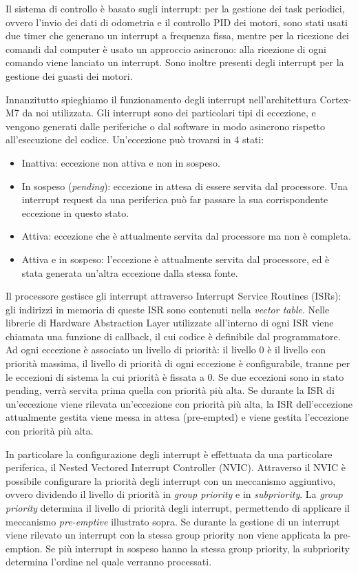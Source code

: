 Il sistema di controllo è basato sugli interrupt: per la gestione dei task periodici, ovvero l'invio dei dati di odometria e il controllo PID dei motori, sono stati usati due timer che generano un interrupt a frequenza fissa, mentre per la ricezione dei comandi dal computer è usato un approccio asincrono: alla ricezione di ogni comando viene lanciato un interrupt. Sono inoltre presenti degli interrupt per la gestione dei guasti dei motori.

Innanzitutto spieghiamo il funzionamento degli interrupt nell'architettura Cortex-M7 da noi utilizzata.
Gli interrupt sono dei particolari tipi di eccezione, e vengono generati dalle periferiche o dal software in modo asincrono rispetto all'esecuzione del codice.
Un'eccezione può trovarsi in 4 stati:
\begin{itemize}
    \item Inattiva: eccezione non attiva e non in sospeso.
    \item In sospeso (\textit{pending}): eccezione in attesa di essere servita dal processore. Una interrupt request da una periferica può far passare la sua corrispondente eccezione in questo stato. 
    \item Attiva: eccezione che è attualmente servita dal processore ma non è completa.
    \item Attiva e in sospeso: l'eccezione è attualmente servita dal processore, ed è stata generata un'altra eccezione dalla stessa fonte. 
\end{itemize}
Il processore gestisce gli interrupt attraverso Interrupt Service Routines (ISRs): gli indirizzi in memoria di queste ISR sono contenuti nella \textit{vector table}. Nelle librerie di Hardware Abstraction Layer utilizzate all'interno di ogni ISR viene chiamata una funzione di callback, il cui codice è definibile dal programmatore.
Ad ogni eccezione è associato un livello di priorità: il livello 0 è il livello con priorità massima, il livello di priorità di ogni eccezione è configurabile, tranne per le eccezioni di sistema la cui priorità è fissata a 0.
Se due eccezioni sono in stato pending, verrà servita prima quella con priorità più alta.
Se durante la ISR di un'eccezione viene rilevata un'eccezione con priorità più alta, la ISR dell'eccezione attualmente gestita viene messa in attesa (pre-empted) e viene gestita l'eccezione con priorità più alta.

In particolare la configurazione degli interrupt è effettuata da una particolare periferica, il Nested Vectored Interrupt Controller (NVIC). Attraverso il NVIC è possibile configurare la priorità degli interrupt con un meccanismo aggiuntivo, ovvero dividendo il livello di priorità in \textit{group priority} e in \textit{subpriority}. 
La \textit{group priority} determina il livello di priorità degli interrupt, permettendo di applicare il meccanismo \textit{pre-emptive} illustrato sopra. Se durante la gestione di un interrupt viene rilevato un interrupt con la stessa group priority non viene applicata la pre-emption.
Se più interrupt in sospeso hanno la stessa group priority, la subpriority determina l'ordine nel quale verranno processati.

